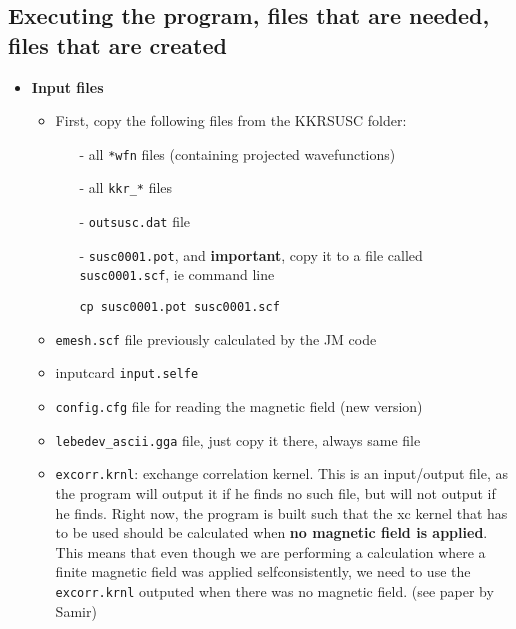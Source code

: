 \documentclass[11pt,fleqn]{book} %
\begin{document}
\subsection{Executing the program, files that are needed, files that are created}
\begin{itemize}


\item  \textbf{Input files}
\begin{itemize}



\item First, copy the following files from the KKRSUSC folder:

\begin{itemize}

 \item[-] all \verb|*wfn| files (containing projected wavefunctions)

  \item[-] all \verb|kkr_*| files

  \item[-] \verb|outsusc.dat| file

  \item[-] \verb|susc0001.pot|, and \textbf{important},
  copy it to a file called \verb|susc0001.scf|,
  ie command line

  \verb|cp susc0001.pot susc0001.scf|

\end{itemize}

\item \verb|emesh.scf| file previously calculated by the JM code

\item inputcard \verb|input.selfe|

\item \verb|config.cfg| file for reading the magnetic field (new version)

\item \verb|lebedev_ascii.gga| file, just copy it there, always same file

\item  \verb|excorr.krnl|: exchange correlation kernel. This is an input/output file, as
the program will output it if he finds no such file, but will not output if he finds.
Right now, the program is built such that the xc kernel that has to be used
should be calculated when \textbf{no magnetic field is applied}.
This means that even though we are performing a calculation where
a finite magnetic field was applied selfconsistently, we need to use
the \verb|excorr.krnl| outputed when there was no magnetic field.
(see paper by Samir)


\end{itemize}
\end{itemize}
\end{document}
